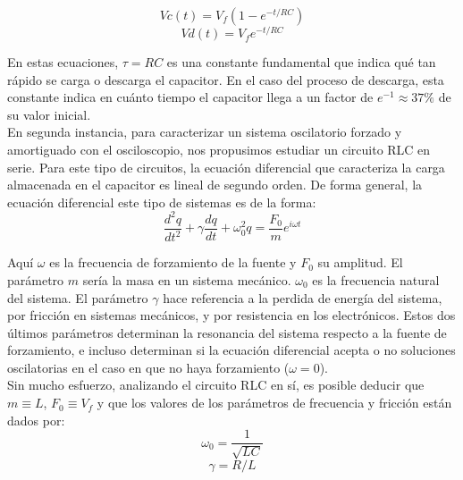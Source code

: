 \documentclass[%
 reprint,
 amsmath,amssymb,
 aps,
]{revtex4-1}
\begin{document}
\begin{equation}
Vc(t) = V_f(1-e^{-t/{RC}})
\end{equation}
\begin{equation}
Vd(t) = V_fe^{-t/{RC}}
\end{equation}

En estas ecuaciones, $\tau = RC$ es una constante fundamental que indica qu\'e tan r\'apido se carga o descarga el capacitor. En el caso del proceso de descarga, esta constante indica en cu\'anto tiempo el capacitor llega a un factor de $e^{-1} \approx 37\% $ de su valor inicial. \\

En segunda instancia, para caracterizar un sistema oscilatorio forzado y amortiguado con el osciloscopio, nos propusimos estudiar un circuito RLC en serie. Para este tipo de circuitos, la ecuaci\'on diferencial que caracteriza la carga almacenada en el capacitor es lineal de segundo orden. De forma general, la ecuación diferencial este tipo de sistemas es de la forma:\\

\begin{equation}
\frac{d^2q}{dt^2} + \gamma\frac{dq}{dt} + \omega_0^2q = \frac{F_0}{m}e^{i\omega t}
\end{equation}

Aqu\'i $\omega$ es la frecuencia de forzamiento de la fuente y $F_0$ su amplitud. El par\'ametro $m$ ser\'ia la masa en un sistema mec\'anico. $\omega_0$ es la frecuencia natural del sistema. El par\'ametro $\gamma$ hace referencia a la perdida de energ\'ia del sistema, por fricci\'on en sistemas mec\'anicos, y por resistencia en los electr\'onicos. Estos dos \'ultimos par\'ametros determinan la resonancia del sistema respecto a la fuente de forzamiento, e incluso determinan si la ecuaci\'on diferencial acepta o no soluciones oscilatorias en el caso en que no haya forzamiento ($\omega = 0$).\\

Sin mucho esfuerzo, analizando el circuito RLC en s\'i, es posible deducir que $m \equiv L$, $F_0 \equiv V_f$ y que los valores de los par\'ametros de frecuencia y fricci\'on están dados por:\\

\begin{equation}
\omega_0 = \frac{1}{\sqrt{LC}}
\end{equation}
\begin{equation}
\gamma = R/L
\end{equation}
\end{document}
